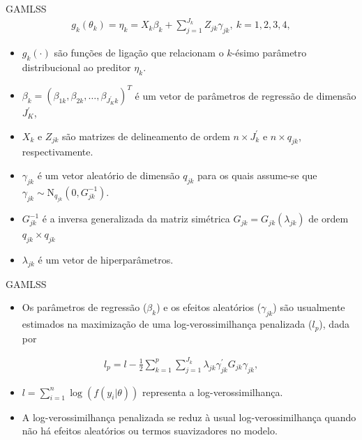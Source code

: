 \documentclass[
  ignorenonframetext,
  serif,
  professionalfont,
  usenames,
  dvipsnames,
  aspectratio = 169]{beamer}
\providecommand{\tightlist}{%
  \setlength{\itemsep}{0pt}\setlength{\parskip}{0pt}}
\renewcommand{\tightlist}{%
  \setlength{\itemsep}{0\baselineskip}
  \setlength{\parskip}{0.25\baselineskip}
}
\begin{document}
\begin{frame}{GAMLSS}
\protect\hypertarget{gamlss-4}{}
\begin{equation}\label{eq.gamlss}
    \begin{aligned}
        g_{k}(\theta_{k}) = \eta_{k} = X_{k} \beta_{k} + \sum_{j=1}^{J_{k}} Z_{jk} \gamma_{jk},\ k=1,2,3,4,
    \end{aligned}
\end{equation}

\begin{itemize}
\item
  \(g_{k}(\cdot)\) são funções de ligação que relacionam o \(k\)-ésimo
  parâmetro distribucional ao preditor \(\eta_{k}\).
\item
  \(\beta_{k} = (\beta_{1k},\beta_{2k},\ldots,\beta_{J_{K}^{'}k})^T\) é
  um vetor de parâmetros de regressão de dimensão \(J_{K}^{'}\),
\item
  \(X_{k}\) e \(Z_{jk}\) são matrizes de delineamento de ordem
  \(n \times J_{k}^{'}\) e \(n \times q_{jk}\), respectivamente.
\item
  \(\gamma_{jk}\) é um vetor aleatório de dimensão \(q_{jk}\) para os
  quais assume-se que
  \(\gamma_{jk} \sim \text{N}_{q_{jk}}(0, G_{jk}^{-1})\).
\item
  \(G_{jk}^{-1}\) é a inversa generalizada da matriz simétrica
  \(G_{jk} = G_{jk}(\lambda_{jk})\) de ordem \(q_{jk} \times q_{jk}\)
\item
  \(\lambda_{jk}\) é um vetor de hiperparâmetros.
\end{itemize}
\end{frame}

\begin{frame}{GAMLSS}
\protect\hypertarget{gamlss-5}{}
\begin{itemize}
\tightlist
\item
  Os parâmetros de regressão (\(\beta_{k}\)) e os efeitos aleatórios
  (\(\gamma_{jk}\)) são usualmente estimados na maximização de uma
  log-verossimilhança penalizada (\(l_p\)), dada por
\end{itemize}

\begin{equation}\label{eq.loglik}
    \begin{aligned}
        l_p = l-\frac{1}{2} \sum_{k=1}^{p} \sum_{j=1}^{J_k} \lambda_{jk} \gamma_{jk}^{'} G_{jk} \gamma_{jk},
    \end{aligned}
\end{equation}

\begin{itemize}
\item
  \(l = \sum_{i=1}^{n} \log(f(y_i|\theta))\) representa a
  log-verossimilhança.
\item
  A log-verossimilhança penalizada se reduz à usual log-verossimilhança
  quando não há efeitos aleatórios ou termos suavizadores no modelo.
\end{itemize}
\end{frame}
\end{document}
